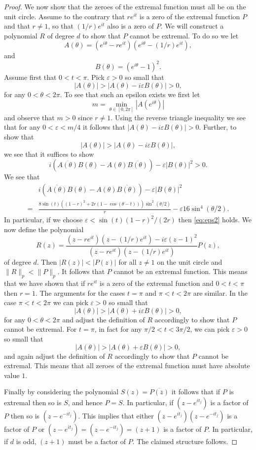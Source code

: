 \documentclass[10pt,a4paper]{amsart}
\begin{document}
\begin{proof}
		We now show that the zeroes of the extremal function must all be on the unit circle. Assume to the contrary that $re^{i t}$ is a zero of the extremal function $P$ and that $r \neq 1$, so that $(1/r) e^{i t}$ also is a zero of $P$. We will construct a polynomial $R$ of degree $d$ to show that $P$ cannot be extremal. To do so we let \[A(\theta)=(e^{i \theta}-re^{it})(e^{i \theta}-(1/r)e^{it}),\]
		and \[B(\theta)=(e^{i \theta}-1)^2.\]
		Assume first that $0<t<\pi$. Pick $\varepsilon>0$ so small that 
		\[|A(\theta)| > |A(\theta)-i\varepsilon B(\theta)|>0, \]
		for any $0<\theta<2 \pi$. To see that such an epsilon exists we first let \[m=\min_{\theta \in [0, 2\pi]} |A(e^{i\theta})|\] and observe that $m>0$ since $r \neq 1$. Using the reverse triangle inequality we see that for any $0<\varepsilon<m/4$ it follows that $|A(\theta)-i\varepsilon B(\theta)|>0$. Further, to show that 
		\begin{equation}\label{eq:eps2}
			|A(\theta)| > |A(\theta)-i\varepsilon B(\theta)|,
		\end{equation}
		we see that it suffices to show
		\[i(\overline{A(\theta)}B(\theta)-A(\theta)\overline{B(\theta)})-\varepsilon|B(\theta)|^2>0.\]  
		We see that
		\[\begin{split}
			&i(\overline{A(\theta)}B(\theta)-A(\theta)\overline{B(\theta)})-\varepsilon|B(\theta)|^2 \\ =&\frac{8 \sin(t)((1-r)^2+2r(1-\cos(\theta-t))) \sin^2(\theta/2)}{r}-\varepsilon16 \sin^4(\theta/2).
		\end{split}\]
		In particular, if we choose $\varepsilon<\sin(t)(1-r)^2/(2r)$ then \eqref{eq:eps2} holds. We now define the polynomial 
		\[R(z)=\frac{(z-re^{it})(z-(1/r)e^{it})-i\varepsilon (z-1)^2}{(z-re^{it})(z-(1/r)e^{it})} P(z),\] of degree $d$. Then $|R(z)|<|P(z)|$ for all $z \neq 1$ on the unit circle and $\|R\|_p < \|P\|_p$. It follows that $P$ cannot be an extremal function. This means that we have shown that if $re^{it}$ is a zero of the extremal function and $0<t<\pi$ then $r=1$. The arguments for the cases $t=\pi$ and $\pi<t<2\pi$ are similar. In the case $\pi<t<2\pi$ we can pick $\varepsilon>0$ so small that \[|A(\theta)| > |A(\theta)+i\varepsilon B(\theta)|>0, \]
		for any $0<\theta<2 \pi$ and adjust the definition of $R$ accordingly to show that $P$ cannot be extremal. For $t=\pi$, in fact for any $\pi/2 < t < 3\pi/2$, we can pick 
		$\varepsilon>0$ so small that \[|A(\theta)| > |A(\theta)+\varepsilon B(\theta)|>0, \]
		and again adjust the definition of $R$ accordingly to show that $P$ cannot be extremal. This means that all zeroes of the extremal function must have absolute value $1$. 
		
		Finally by considering the polynomial $S(z)=\overline{P(\overline{z})}$ it follows that if $P$ is extremal then so is $S$, and hence $P=S$. In particular, if $(z-e^{it_j})$ is a factor of $P$ then so is $(z-e^{-it_j})$. This implies that either $(z-e^{it_j})(z-e^{-it_j})$ is a factor of $P$ or $(z-e^{it_j})=(z-e^{-it_j})=(z+1)$ is  a factor of $P$. In particular, if $d$ is odd, $(z+1)$ must be a factor of $P$. The claimed structure follows.
	\end{proof}
\end{document}
